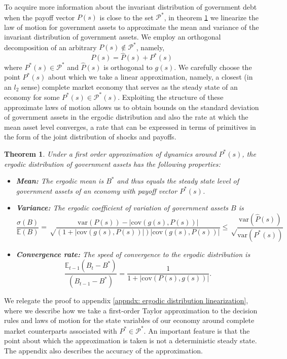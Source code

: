 \documentclass[thmsb,11pt]{article}
\newtheorem{theorem}{Theorem}
\newcommand{\EE}{\mathbb E}
\newcommand{\var}{\mathrm{var}}
\newcommand{\cov}{\mathrm{cov}}
\begin{document}
To acquire more information about the invariant distribution of government debt when the payoff vector $P(s)$ is close to  the set $\mathcal{P}^*$, in  theorem \ref{thm: rep agent linear policies} we linearize the law of motion for  government assets to approximate %
  the mean and variance of the invariant distribution of government assets.
We employ an  orthogonal decomposition of an arbitrary $P(s) \not \in \mathcal{P}^*$, namely,
\[P(s)=\hat{P}(s)+P^*(s)\] where $P^*(s)\in \mathcal{P}^*$ and $\hat{P}(s)$ is orthogonal to $g(s)$. We carefully  choose the point
$P^*(s)$ about which we take a linear  approximation, namely,
a closest (in an $l_2$ sense) complete market economy that  serves as the steady state of an economy for  some $P^*(s)\in\mathcal{P}^*(s)$.
Exploiting the structure of these approximate laws of motion allows us to obtain bounds on the standard deviation of government  assets in the
ergodic distribution and also the rate at which the mean asset level converges, a rate  that can be expressed in terms of primitives in the form
of the joint distribution of shocks and payoffs.

\begin{theorem}
\label{thm: rep agent linear policies}
Under a  first order approximation of dynamics around $P^*(s)$, the ergodic distribution of government assets has the following properties:
\begin{itemize}
 \item \textbf{Mean:} The ergodic mean is $B^*$ and thus equals the steady state level of government assets  of an economy with payoff vector $P^*(s)$.
 \item \textbf{Variance:} The ergodic coefficient of variation of government assets $B$ is
  \[
    \frac{\sigma(B)}{\mathbb E(B)} = \sqrt\frac{\var(P(s)) - |\cov(g(s),P(s))|}{(1+|\cov(g(s),P(s))|)|\cov(g(s),P(s))|}\leq\sqrt\frac{\var(\hat{P}(s))}{\var(P^*(s))}
  \]
  \item \textbf{Convergence rate:} The speed of convergence to the ergodic distribution is
  \[
    \frac{\EE_{t-1}(B_t-B^*)}{(B_{t-1} - B^*)} = \frac1{1+|\cov(P(s),g(s))|}.
  \]

\end{itemize}


\end{theorem}
 We relegate the proof to appendix  \ref{appndx: ergodic distribution linearization}, where we describe how %
we take a first-order Taylor approximation to the decision rules and laws of motion for the state variables of our
economy around complete market counterparts associated with $P^*\in \mathcal{P}^*$.
An important feature is that the point about which the  approximation is taken is not a deterministic steady state.
The appendix also describes the accuracy of the approximation.
\end{document}
